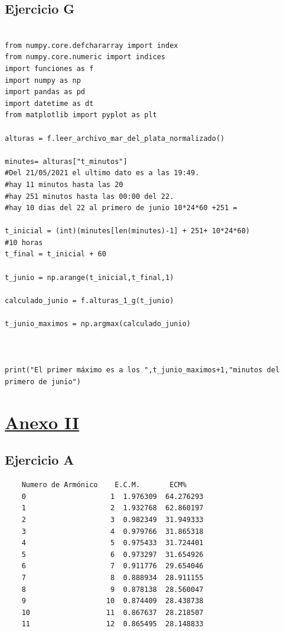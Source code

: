 \documentclass[10pt,a4paper]{article}
\numberwithin{equation}{section}
\numberwithin{figure}{section}
\numberwithin{table}{section}
\begin{document}
\subsection{Ejercicio G}
\begin{verbatim}
    
from numpy.core.defchararray import index
from numpy.core.numeric import indices
import funciones as f
import numpy as np
import pandas as pd
import datetime as dt
from matplotlib import pyplot as plt

alturas = f.leer_archivo_mar_del_plata_normalizado()

minutes= alturas["t_minutos"]
#Del 21/05/2021 el ultimo dato es a las 19:49. 
#hay 11 minutos hasta las 20
#hay 251 minutos hasta las 00:00 del 22.
#hay 10 dias del 22 al primero de junio 10*24*60 +251 = 

t_inicial = (int)(minutes[len(minutes)-1] + 251+ 10*24*60)
#10 horas
t_final = t_inicial + 60

t_junio = np.arange(t_inicial,t_final,1)

calculado_junio = f.alturas_1_g(t_junio)

t_junio_maximos = np.argmax(calculado_junio)



print("El primer máximo es a los ",t_junio_maximos+1,"minutos del primero de junio")

\end{verbatim}


\section{\underline{Anexo II}}
\subsection{Ejercicio A}
\begin{verbatim}
    Numero de Armónico    E.C.M.       ECM%
    0                    1  1.976309  64.276293
    1                    2  1.932768  62.860197
    2                    3  0.982349  31.949333
    3                    4  0.979766  31.865318
    4                    5  0.975433  31.724401
    5                    6  0.973297  31.654926
    6                    7  0.911776  29.654046
    7                    8  0.888934  28.911155
    8                    9  0.878138  28.560047
    9                   10  0.874409  28.438738
    10                  11  0.867637  28.218507
    11                  12  0.865495  28.148833
\end{verbatim}
\end{document}
